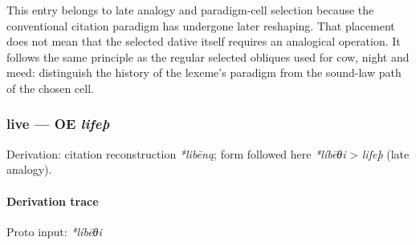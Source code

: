 \documentclass[
  british,
  a4paper,
]{article}
\begin{document}
This entry belongs to late analogy and paradigm-cell selection because
the conventional citation paradigm has undergone later reshaping. That
placement does not mean that the selected dative itself requires an
analogical operation. It follows the same principle as the regular
selected obliques used for cow, night and meed: distinguish the history
of the lexeme's paradigm from the sound-law path of the chosen cell.

\subsubsection{\texorpdfstring{live --- OE
\emph{lifeþ}}{live --- OE lifeþ}}\label{live-oe-lifeuxfe}

Derivation: citation reconstruction \emph{*libēną}; form followed here
\emph{*líbēθi} \textgreater{} \emph{lifeþ} (late analogy).

\paragraph{Derivation trace}\label{derivation-trace-131}

Proto input: \emph{*líbēθi}

\begingroup
\setlength{\fboxsep}{6pt}
\end{document}
